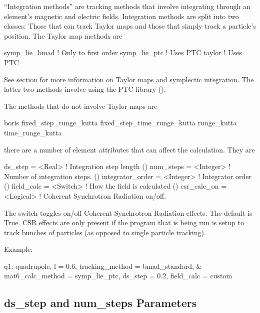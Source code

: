 ``Integration methods'' are tracking methods that involve integrating
through an element's magnetic and electric fields.  Integration
methods are split into two classes: Those that can track Taylor maps and
those that simply track a particle's position.  The Taylor map methods
are
\begin{example}
  symp_lie_bmad   ! Only to first order
  symp_lie_ptc    ! Uses PTC
  taylor          ! Uses PTC
\end{example}
See section  for more information on Taylor maps
and symplectic integration. The latter two methods involve using the
PTC library ().

The methods that do not involve Taylor maps are
\begin{example}
  boris
  fixed_step_runge_kutta
  fixed_step_time_runge_kutta
  runge_kutta
  time_runge_kutta
\end{example}

there are a number of element attributes that can affect the
calculation. They are
\begin{example}
  ds_step = <Real>              ! Integration step length ()
  num_steps = <Integer>         ! Number of integration steps. ()
  integrator_order = <Integer>  ! Integrator order ()
  field_calc = <Switch>         ! How the field is calculated ()
  csr_calc_on = <Logical>       ! Coherent Synchrotron Radiation on/off.
\end{example}

The  switch toggles on/off Coherent Synchrotron Radiation effects.  The default is
True. CSR effects are only present if the program that is being run is setup to track bunches of
particles (as opposed to single particle tracking).

Example:
\begin{example}
  q1: quadrupole, l = 0.6, tracking_method = bmad_standard, &
        mat6_calc_method = symp_lie_ptc, ds_step = 0.2, field_calc = custom
\end{example}

\subsection{ds_step and num_steps Parameters}
\label{s:ds.step}

